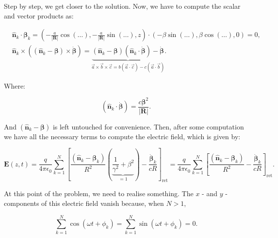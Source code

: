 Step by step, we get closer to the solution. Now, we have to compute the scalar and vector products as:

\begin{equation}
	\begin{split}
		&\hat{\mathbf{n}}_{k} \cdot \boldsymbol{\beta}_{k}= ( -\tfrac{a}{|\mathbf{R}|} \cos \left(\dots\right), -\tfrac{a}{|\mathbf{R}|} \sin \left(\dots\right) , z )\cdot (-\beta \sin \left(\dots\right), \beta \cos \left(\dots\right) ,0)  =0,\\
		&\hat{\mathbf{n}}_{k} \times\left(\left(\hat{\mathbf{n}}_{k}-\boldsymbol{\beta}\right) \times \dot{\boldsymbol{\beta}}\right)= \underbrace{\left(\hat{\mathbf{n}}_{k}-\boldsymbol{\beta}\right)\left(\hat{\mathbf{n}}_{k} \cdot \dot{\boldsymbol{\beta}}\right)-\dot{\boldsymbol{\beta}}}_{\vec{a}\times \vec{b}\times\vec{c} = b (\vec{a}\cdot \vec{c})- c (\vec{a}\cdot \vec{b})}.
	\end{split}
\end{equation}

Where:

\begin{equation}
	\left(\hat{\mathbf{n}}_{k} \cdot \dot{\boldsymbol{\beta}}\right) = \frac{c \boldsymbol{\beta}^{2}}{|\mathbf{R}|}.
\end{equation}

And $\left(\hat{\mathbf{n}}_{k}-\boldsymbol{\beta}\right)$ is left untouched for convenience. Then, after some computation we have all the necessary terms to compute the electric field, which is given by:

\begin{equation}\label{almost}
	\mathbf{E}(z, t)=\frac{q}{4 \pi \epsilon_{0}} \sum_{k=1}^{N}\left[\frac{\left(\hat{\mathbf{n}}_{k}-\boldsymbol{\beta}_{k}\right)}{R^{2}}\left(\underbrace{\frac{1}{\gamma^{2}}+\beta^{2}}_{\text{$=1$}}\right)-\frac{\dot{\boldsymbol{\beta}}_{k}}{c R}\right]_{\mathrm{ret}}=\frac{q}{4 \pi \epsilon_{0}} \sum_{k=1}^{N}\left[\frac{\left(\hat{\mathbf{n}}_{k}-\boldsymbol{\beta}_{k}\right)}{R^{2}}-\frac{\dot{\boldsymbol{\beta}}_{k}}{c R}\right]_{\mathrm{ret}}.
\end{equation}

At this point of the problem, we need to realise something. The $x$ - and $y$ -components of this electric field vanish because, when $N>1$,

\begin{equation}
	\sum_{k=1}^{N} \cos \left(\omega t+\phi_{k}\right)=\sum_{k=1}^{N} \sin \left(\omega t+\phi_{k}\right)=0.
\end{equation}

